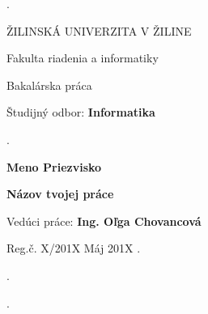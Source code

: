 




\pagestyle{empty}

\begin{titlepage}
\phantom.

\bigskip

\begin{center}
{\sc\LARGE ŽILINSKÁ UNIVERZITA V ŽILINE}
\medskip

{\sc\Large Fakulta riadenia a informatiky}

\vspace{7.5cm}

{\sc\LARGE Bakalárska práca}

\medskip

{\large Študijný odbor: {\bf Informatika}}
\end{center}


\vspace{4cm}



\phantom.\hfill

\begin{center}
{\large\bf Meno Priezvisko}

\medskip

{\large\bf Názov tvojej práce}

\medskip

Vedúci práce: {\bf Ing. Oľga Chovancová}
\medskip

\hfill
Reg.č. X/201X
\hfill
Máj 201X
\hfill\phantom.
\end{center}

\hspace{1.7cm}\phantom.


\phantom.
\end{titlepage}
\clearpage

\clearpage

